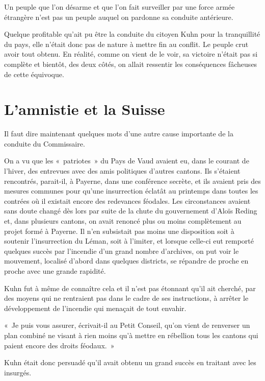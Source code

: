 \documentclass[french,twoside]{book} %
\newenvironment{quoteblock}%
  {\begin{quoting}}
  {\end{quoting}}
\newenvironment{quotebar}{%
    \def\FrameCommand{{\color{rubric!10!}\vrule width 0.5em} \hspace{0.9em}}%
    \def\OuterFrameSep{\itemsep} %
    \MakeFramed {\advance\hsize-\width \FrameRestore}
  }%
  {%
    \endMakeFramed
  }
\renewenvironment{quoteblock}%
  {%
    \savenotes
    \setstretch{0.9}
    \normalfont
    \begin{quotebar}
  }
  {%
    \end{quotebar}
    \spewnotes
  }
\begin{document}
\noindent Un peuple que l’on désarme et que l’on fait surveiller par une force armée étrangère n’est pas un peuple auquel on pardonne sa conduite antérieure.\par
Quelque profitable qu’ait pu être la conduite du citoyen Kuhn pour la tranquillité du pays, elle n’était donc pas de nature à mettre fin au conflit. Le peuple crut avoir tout obtenu. En réalité, comme on vient de le voir, sa victoire n’était pas si complète et bientôt, des deux côtés, on allait ressentir les conséquences fâcheuses de cette équivoque.
\section[L’amnistie et la Suisse]{L’amnistie et la Suisse}
\noindent Il faut dire maintenant quelques mots d’une autre cause importante de la conduite du Commissaire.\par
On a vu que les « patriotes » du Pays de Vaud avaient eu, dans le courant de l’hiver, des entrevues avec des amis politiques d’autres cantons. Ils s’étaient rencontrés, parait-il, à Payerne, dans une conférence secrète, et ils avaient pris des mesures communes pour qu’une insurrection éclatât au printemps dans toutes les contrées où il existait encore des redevances féodales. Les circonstances avaient sans doute changé dès lors par suite de la chute du gouvernement d’Aloïs Reding et, dans plusieurs cantons, on avait renoncé plus ou moins complètement au projet formé à Payerne. Il n’en subsistait pas moins une disposition soit à soutenir l’insurrection du Léman, soit à l’imiter, et lorsque celle-ci eut remporté quelques succès par l’incendie d’un grand nombre d’archives, on put voir le mouvement, localisé d’abord dans quelques districts, se répandre de proche en proche avec une grande rapidité.\par
Kuhn fut à même de connaître cela et il n’est pas étonnant qu’il ait cherché, par des moyens qui ne rentraient pas dans le cadre de ses instructions, à arrêter le développement de l’incendie qui menaçait de tout envahir.\par

\begin{quoteblock}
 \noindent « Je puis vous assurer, écrivait-il au Petit Conseil, qu’on vient de renverser un plan combiné ne visant à rien moins qu’à mettre en rébellion tous les cantons qui paient encore des droits féodaux. »
 \end{quoteblock}

\noindent Kuhn était donc persuadé qu’il avait obtenu un grand succès en traitant avec les insurgés.\par
\end{document}
